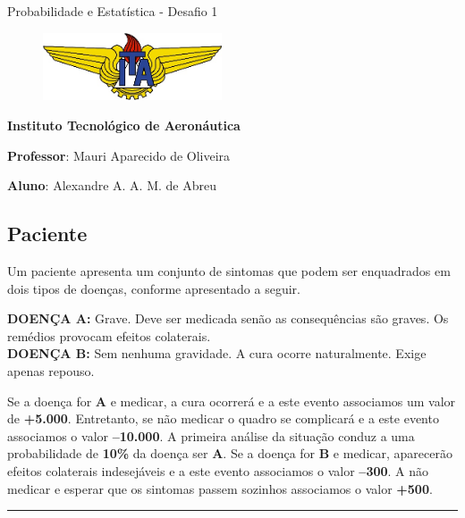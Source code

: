 \documentclass[
  letterpaper,
  DIV=11,
  numbers=noendperiod]{scrartcl}
\author{}
\date{}
\begin{document}
\ifdefined\Shaded\renewenvironment{Shaded}{\begin{tcolorbox}[interior hidden, boxrule=0pt, frame hidden, breakable, sharp corners, borderline west={3pt}{0pt}{shadecolor}, enhanced]}{\end{tcolorbox}}\fi

Probabilidade e Estatística - Desafio 1

\begin{figure}

{\centering \includegraphics[width=2.08333in,height=\textheight]{images/ita.jpg}

}

\end{figure}

\textbf{Instituto Tecnológico de Aeronáutica}

\textbf{Professor}: Mauri Aparecido de Oliveira

\textbf{Aluno}: Alexandre A. A. M. de Abreu

\hypertarget{paciente}{%
\subsection{Paciente}\label{paciente}}

Um paciente apresenta um conjunto de sintomas que podem ser enquadrados
em dois tipos de doenças, conforme apresentado a seguir.

\textbf{DOENÇA A:} Grave. Deve ser medicada senão as consequências são
graves. Os remédios provocam efeitos colaterais.\\
\textbf{DOENÇA B:} Sem nenhuma gravidade. A cura ocorre naturalmente.
Exige apenas repouso.

Se a doença for \textbf{A} e medicar, a cura ocorrerá e a este evento
associamos um valor de \textbf{+5.000}. Entretanto, se não medicar o
quadro se complicará e a este evento associamos o valor
\textbf{--10.000}. A primeira análise da situação conduz a uma
probabilidade de \textbf{10\%} da doença ser \textbf{A}. Se a doença for
\textbf{B} e medicar, aparecerão efeitos colaterais indesejáveis e a
este evento associamos o valor \textbf{--300}. A não medicar e esperar
que os sintomas passem sozinhos associamos o valor \textbf{+500}.

\begin{center}\rule{0.5\linewidth}{0.5pt}\end{center}
\end{document}
